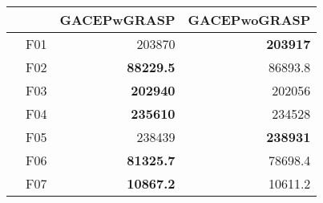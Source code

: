 \begin{table}[]
\begin{tabular}{ll|r|r|}
\cline{3-4}
                                                                         &                                 & \multicolumn{1}{l|}{\cellcolor[HTML]{FFFFC7}GACEPwGRASP}       & \multicolumn{1}{l|}{\cellcolor[HTML]{FFFFC7}GACEPwoGRASP} \\ \hline
\multicolumn{1}{|l|}{\cellcolor[HTML]{ECF4FF}}                           & \cellcolor[HTML]{FCE6AB}F01     & 203870                                                         & \cellcolor[HTML]{D3FFB6}\textbf{203917}                   \\ \cline{2-4} 
\multicolumn{1}{|l|}{\cellcolor[HTML]{ECF4FF}}                           & \cellcolor[HTML]{FCE6AB}F02     & \cellcolor[HTML]{D3FFB6}\textbf{88229.5}                       & 86893.8                                                   \\ \cline{2-4} 
\multicolumn{1}{|l|}{\cellcolor[HTML]{ECF4FF}}                           & \cellcolor[HTML]{FCE6AB}F03     & \cellcolor[HTML]{D3FFB6}\textbf{202940}                        & 202056                                                    \\ \cline{2-4} 
\multicolumn{1}{|l|}{\cellcolor[HTML]{ECF4FF}}                           & \cellcolor[HTML]{FCE6AB}F04     & \cellcolor[HTML]{D3FFB6}\textbf{235610}                        & 234528                                                    \\ \cline{2-4} 
\multicolumn{1}{|l|}{\cellcolor[HTML]{ECF4FF}}                           & \cellcolor[HTML]{FCE6AB}F05     & 238439                                                         & \cellcolor[HTML]{D3FFB6}\textbf{238931}                   \\ \cline{2-4} 
\multicolumn{1}{|l|}{\cellcolor[HTML]{ECF4FF}}                           & \cellcolor[HTML]{FCE6AB}F06     & \cellcolor[HTML]{D3FFB6}\textbf{81325.7}                       & 78698.4                                                   \\ \cline{2-4} 
\multicolumn{1}{|l|}{\cellcolor[HTML]{ECF4FF}}                           & \cellcolor[HTML]{FCE6AB}F07     & \cellcolor[HTML]{D3FFB6}\textbf{10867.2}                       & 10611.2                                                   \\ \cline{2-4} 

\end{tabular}
\end{table}
